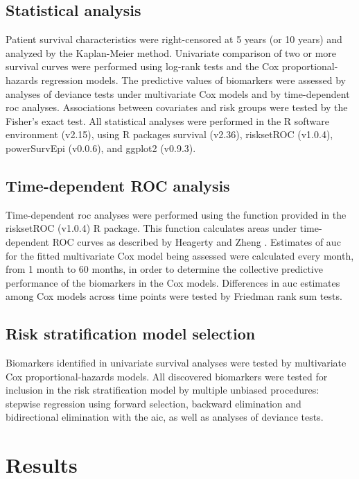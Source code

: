 \subsection{Statistical analysis}

Patient survival characteristics were right-censored at 5 years (or 10 years) and analyzed by the Kaplan-Meier method. Univariate comparison of two or more survival curves were performed using log-rank tests and the Cox proportional-hazards regression models. The predictive values of biomarkers were assessed by analyses of deviance tests under multivariate Cox models and by time-dependent \gls{roc} analyses. Associations between covariates and risk groups were tested by the Fisher's exact test. All statistical analyses were performed in the R software environment (v2.15), using R packages survival (v2.36), risksetROC (v1.0.4), powerSurvEpi (v0.0.6), and ggplot2 (v0.9.3).

\subsection{Time-dependent ROC analysis}

Time-dependent \gls{roc} analyses were performed using the  function provided in the risksetROC (v1.0.4) R package. This function calculates areas under time-dependent ROC curves as described by Heagerty and Zheng . Estimates of \gls{auc} for the fitted multivariate Cox model being assessed were calculated every month, from 1 month to 60 months, in order to determine the collective predictive performance of the biomarkers in the Cox models. Differences in \gls{auc} estimates among Cox models across time points were tested by Friedman rank sum tests.

\subsection{Risk stratification model selection}

Biomarkers identified in univariate survival analyses were tested by multivariate Cox proportional-hazards models. All discovered biomarkers were tested for inclusion in the risk stratification model by multiple unbiased procedures: stepwise regression using forward selection, backward elimination and bidirectional elimination with the \gls{aic}, as well as analyses of deviance tests.


\section{Results}

